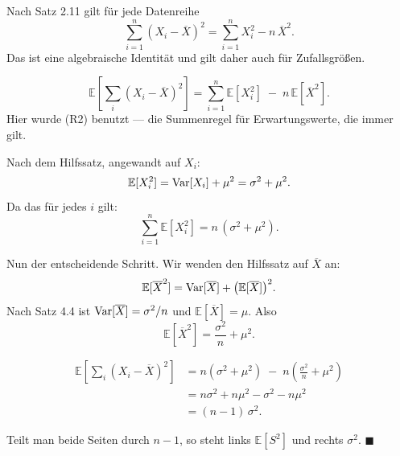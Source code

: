 \begin{merksatz}
Nach Satz 2.11 gilt für jede Datenreihe
\[ \sum_{i=1}^n (X_i - \overline X)^2 = \sum_{i=1}^n X_i^2 - n\,\overline X^2 . \]
Das ist eine algebraische Identität und gilt daher auch für Zufallsgrößen.

\[ \mathbb{E}\left[\sum_i (X_i-\overline X)^2\right] = \sum_{i=1}^n \mathbb{E}[X_i^2] \;-\; n\,\mathbb{E}[\overline X^2] . \]
Hier wurde (R2) benutzt --- die Summenregel für Erwartungswerte, die immer gilt.

Nach dem Hilfssatz, angewandt auf $X_i$:
\[ \mathbb{E}[X_i^2] = \operatorname{Var}[X_i] + \mu^2 = \sigma^2 + \mu^2 . \]
Da das für jedes $i$ gilt:
\[ \sum_{i=1}^n \mathbb{E}[X_i^2] = n\,(\sigma^2 + \mu^2) . \]

Nun der entscheidende Schritt. Wir wenden den Hilfssatz auf $\overline X$ an:
\[ \mathbb{E}[\overline X^2] = \operatorname{Var}[\overline X] + \bigl(\mathbb{E}[\overline X]\bigr)^2 . \]
Nach Satz 4.4 ist $\operatorname{Var}[\overline X] = \sigma^2/n$ und $\mathbb{E}[\overline X] = \mu$. Also
\[ \mathbb{E}[\overline X^2] = \frac{\sigma^2}{n} + \mu^2 . \]

\begin{align*}
\mathbb{E}\left[\sum_i (X_i-\overline X)^2\right] &= n(\sigma^2+\mu^2) \;-\; n\left(\frac{\sigma^2}{n} + \mu^2\right)\\
&= n\sigma^2 + n\mu^2 - \sigma^2 - n\mu^2\\
&= (n-1)\,\sigma^2 .
\end{align*}

Teilt man beide Seiten durch $n-1$, so steht links $\mathbb{E}[S^2]$ und rechts $\sigma^2$. $\blacksquare$
\end{merksatz}

